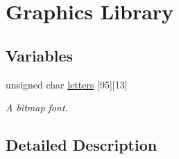 \hypertarget{group__graphics}{}\section{Graphics Library}
\label{group__graphics}
\subsection*{Variables}
\begin{DoxyCompactItemize}
\item 
unsigned char \hyperlink{group__graphics_ga059dc2a923cc926cb19214aa9a8301e3}{letters} \mbox{[}95\mbox{]}\mbox{[}13\mbox{]}\hypertarget{group__graphics_ga059dc2a923cc926cb19214aa9a8301e3}{}\label{group__graphics_ga059dc2a923cc926cb19214aa9a8301e3}

\begin{DoxyCompactList}\small\item\em A bitmap font. \end{DoxyCompactList}\end{DoxyCompactItemize}


\subsection{Detailed Description}
